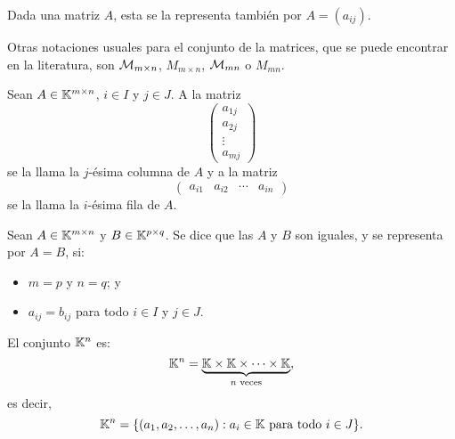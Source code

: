 \documentclass[a4,11pt]{aleph-notas}
\begin{document}


\begin{advertencia}
    Dada una matriz $A$, esta se la representa también por $A=(a_{ij})$.
\end{advertencia}

\begin{advertencia}
    Otras notaciones usuales para el conjunto de la matrices, que se puede encontrar en la literatura, son $\M_{m\times n}$, $M_{m\times n}$, $\M_{mn}$ o $M_{mn}$.
\end{advertencia}

\begin{defi}
    Sean $A\in\Mat[\K]{m}{n}$, $i\in I$ y $j\in J$. A la matriz
    \[
        \begin{pmatrix}
        a_{1j} \\ 
        a_{2j} \\ 
        \vdots \\ 
        a_{mj} 
        \end{pmatrix}
    \]
    se la llama la $j$-ésima columna de $A$ y a la matriz
    \[
        \begin{pmatrix}
        a_{i1}& a_{i2}&\cdots& a_{in}
        \end{pmatrix}
    \]
    se la llama la $i$-ésima fila de $A$.
\end{defi}

\begin{prop}
    Sean $A \in \Mat[\K]{m}{n}$ y $B \in \Mat[\K]{p}{q}$. Se dice que las $A$ y $B$ son iguales, y se representa por $A=B$, si:
    \begin{itemize}
    \item 
        $m=p$ y $n=q$; y
    \item 
        $a_{ij}=b_{ij}$ para todo $i\in I$ y $j \in J$.
    \end{itemize}
\end{prop}

\begin{defi}[Vectores]
    El conjunto $\K^n$ es:
    \[
        \K^n=\underbrace{\K\times\K\times\cdots\times\K}_{n\text{ veces}},
    \]
    es decir,
    \[
        \K^n=\{(a_1,a_2,\ldots,a_n):a_i\in\K\text{ para todo }i \in J\}.
    \]
\end{defi}
\end{document}

